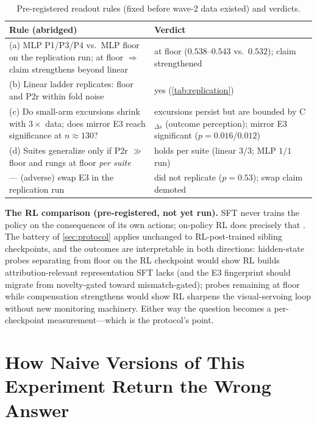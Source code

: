 \documentclass{article}
\begin{document}
\begin{table}[t]
\caption{Pre-registered readout rules (fixed before wave-2 data existed)
and verdicts.}
\label{tab:receipts}
\vskip 0.1in
\centering
\footnotesize
\begin{tabular}{p{}p{}}
\toprule
Rule (abridged) & Verdict \\
\midrule
(a) MLP P1/P3/P4 vs.\ MLP floor on the replication run; at floor $\Rightarrow$
claim strengthens beyond linear & at floor ($0.538$--$0.543$ vs.\ $0.532$);
claim strengthened \\
(b) Linear ladder replicates: floor and P2r within fold noise & yes
(\cref{tab:replication}) \\
(c) Do small-arm excursions shrink with $3\times$ data; does mirror E3 reach
significance at $n{\approx}130$? & excursions persist but are bounded by
C$_{\Delta s}$ (outcome perception); mirror E3 significant
($p{=}0.016$/$0.012$) \\
(d) Suites generalize only if P2r $\gg$ floor and rungs at floor
\emph{per suite} & holds per suite (linear $3/3$; MLP $1/1$ run) \\
--- (adverse) swap E3 in the replication run & did not replicate
($p{=}0.53$); swap claim demoted \\
\bottomrule
\end{tabular}
\vskip -0.1in
\end{table}

\textbf{The RL comparison (pre-registered, not yet run).} SFT never trains
the policy on the consequences of its own actions; on-policy RL does
precisely that \citep{shao2024deepseekmath,zhu2025wmpo}. The battery of
\cref{sec:protocol} applies unchanged to RL-post-trained sibling
checkpoints, and the outcomes are interpretable in both directions:
hidden-state probes separating from floor on the RL checkpoint would show
RL builds attribution-relevant representation SFT lacks (and the E3
fingerprint should migrate from novelty-gated toward mismatch-gated);
probes remaining at floor while compensation strengthens would show RL
sharpens the visual-servoing loop without new monitoring machinery. Either
way the question becomes a per-checkpoint measurement---which is the
protocol's point.

\section{How Naive Versions of This Experiment Return the Wrong Answer}
\label{sec:traps}
\end{document}
